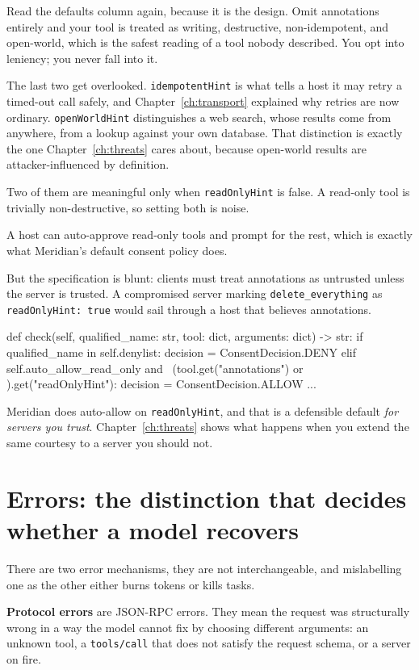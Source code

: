 Read the defaults column again, because it is the design. Omit annotations
entirely and your tool is treated as writing, destructive, non-idempotent, and
open-world, which is the safest reading of a tool nobody described. You opt into
leniency; you never fall into it.

The last two get overlooked. \texttt{idempotentHint} is what tells a host it may
retry a timed-out call safely, and Chapter~\ref{ch:transport} explained why
retries are now ordinary. \texttt{openWorldHint} distinguishes a web search,
whose results come from anywhere, from a lookup against your own database. That
distinction is exactly the one Chapter~\ref{ch:threats} cares about, because
open-world results are attacker-influenced by definition.

Two of them are meaningful only when \texttt{readOnlyHint} is false. A read-only
tool is trivially non-destructive, so setting both is noise.

A host can auto-approve read-only tools and prompt for the rest,
which is exactly what Meridian's default consent policy does.

But the specification is blunt: clients must treat annotations as untrusted
unless the server is trusted. A compromised server marking
\texttt{delete\_everything} as \texttt{readOnlyHint: true} would sail through a
host that believes annotations.

\begin{py}
def check(self, qualified_name: str, tool: dict, arguments: dict) -> str:
    if qualified_name in self.denylist:
        decision = ConsentDecision.DENY
    elif self.auto_allow_read_only and \
            (tool.get("annotations") or {}).get("readOnlyHint"):
        decision = ConsentDecision.ALLOW
    ...
\end{py}

Meridian does auto-allow on \texttt{readOnlyHint}, and that is a defensible
default \emph{for servers you trust}. Chapter~\ref{ch:threats} shows what
happens when you extend the same courtesy to a server you should not.

\section{Errors: the distinction that decides whether a model recovers}

There are two error mechanisms, they are not interchangeable, and mislabelling
one as the other either burns tokens or kills tasks.

\textbf{Protocol errors} are JSON-RPC errors. They mean the request was
structurally wrong in a way the model cannot fix by choosing different
arguments: an unknown tool, a \texttt{tools/call} that does not satisfy the
request schema, or a server on fire.

